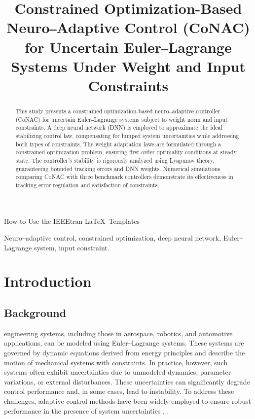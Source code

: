 \documentclass[lettersize,journal]{IEEEtran}
\begin{document}
\title{
Constrained Optimization-Based Neuro‒Adaptive Control (CoNAC) for Uncertain Euler‒Lagrange Systems Under Weight and Input Constraints 
}


%
{How to Use the IEEEtran \LaTeX \ Templates}

\maketitle

\begin{abstract}
    This study presents a constrained optimization-based neuro‒adaptive controller (CoNAC) for uncertain Euler‒Lagrange systems subject to weight norm and input constraints. A deep neural network (DNN) is employed to approximate the ideal stabilizing control law, compensating for lumped system uncertainties while addressing both types of constraints. The weight adaptation laws are formulated through a constrained optimization problem, ensuring first-order optimality conditions at steady state. The controller's stability is rigorously analyzed using Lyapunov theory, guaranteeing bounded tracking errors and DNN weights. Numerical simulations comparing CoNAC with three benchmark controllers demonstrate its effectiveness in tracking error regulation and satisfaction of constraints.
\end{abstract}

\begin{IEEEkeywords}
Neuro‒adaptive control, constrained optimization, deep neural network, Euler‒Lagrange system, input constraint.
\end{IEEEkeywords}

\section{Introduction}

\subsection{Background}

 engineering systems, including those in aerospace, robotics, and automotive applications, can be modeled using Euler‒Lagrange systems. These systems are governed by dynamic equations derived from energy principles and describe the motion of mechanical systems with constraints. In practice, however, such systems often exhibit uncertainties due to unmodeled dynamics, parameter variations, or external disturbances. These uncertainties can significantly degrade control performance and, in some cases, lead to instability. To address these challenges, adaptive control methods have been widely employed to ensure robust performance in the presence of system uncertainties \cite{RN4}, \cite{RN2}.
\end{document}
